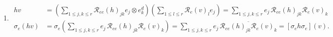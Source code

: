 \documentclass[aps,preprint]{revtex4}%
\newtheorem{lemma}[theorem]{Lemma}
\begin{document}
\begin{enumerate}
\begin{enumerate}
\begin{lemma}%
\begin{align}
\overline{\mathfrak{h}\left(  v_{2},v_{1}\right)  }  &  =%
{\displaystyle\sum\limits_{1\leq j,k\leq r}}
\mathcal{R}_{e}\left(  v_{2}\right)  _{j}\overline{\mathcal{R}_{e}\left(
h\right)  _{jk}}\overline{\mathcal{R}_{e}\left(  v_{1}\right)  _{k}}=%
{\displaystyle\sum\limits_{1\leq j,k\leq r}}
\mathcal{R}_{e}\left(  v_{2}\right)  _{k}\mathcal{R}_{e}\left(  h\right)
_{jk}\overline{\mathcal{R}_{e}\left(  v_{1}\right)  _{j}}=%
{\displaystyle\sum\limits_{1\leq j,k\leq r}}
\mathcal{R}_{e}\left(  v_{2}\right)  _{k}\mathcal{R}_{e}\left(  h\right)
_{jk}\mathcal{R}_{e}\left(  \sigma_{e}\left(  v_{1}\right)  \right)  _{j}\\
&  =%
{\displaystyle\sum\limits_{1\leq j,k\leq r}}
\overline{\mathcal{R}_{e}\left(  v_{1}\right)  _{j}}\mathcal{R}_{e}\left(
h\right)  _{jk}\mathcal{R}_{e}\left(  v_{2}\right)  _{k}=%
{\displaystyle\sum\limits_{1\leq j,k\leq r}}
\mathcal{R}_{e}\left(  \sigma_{e}\left(  v_{1}\right)  \right)  _{j}%
\mathcal{R}_{e}\left(  h\right)  _{jk}\mathcal{R}_{e}\left(  v_{2}\right)
_{k}=\mathfrak{h}\left(  v_{1},v_{2}\right)  .
\end{align}

\end{lemma}

\item
\begin{align}
hv  &  =\left(
{\displaystyle\sum\limits_{1\leq j,k\leq r}}
\mathcal{R}_{ee}\left(  h\right)  _{jk}e_{j}\otimes e_{k}^{d}\right)  \left(
{\displaystyle\sum\limits_{1\leq l\leq r}}
\mathcal{R}_{e}\left(  v\right)  _{l}e_{j}\right)  =%
{\displaystyle\sum\limits_{1\leq j,k\leq r}}
e_{j\ }\mathcal{R}_{ee}\left(  h\right)  _{jk}\mathcal{R}_{e}\left(  v\right)
_{k}\\
\sigma_{e}\left(  hv\right)   &  =\sigma_{e}\left(
{\displaystyle\sum\limits_{1\leq j,k\leq r}}
e_{j\ }\mathcal{R}_{ee}\left(  h\right)  _{jk}\mathcal{R}_{e}\left(  v\right)
_{k}\right)  =%
{\displaystyle\sum\limits_{1\leq j,k\leq r}}
e_{j\ }\overline{\mathcal{R}_{ee}\left(  h\right)  _{jk}\mathcal{R}_{e}\left(
v\right)  _{k}}=\left[  \sigma_{e}h\sigma_{e}\right]  \left(  v\right)  .
\end{align}



\end{enumerate}
\end{enumerate}
\end{document}
